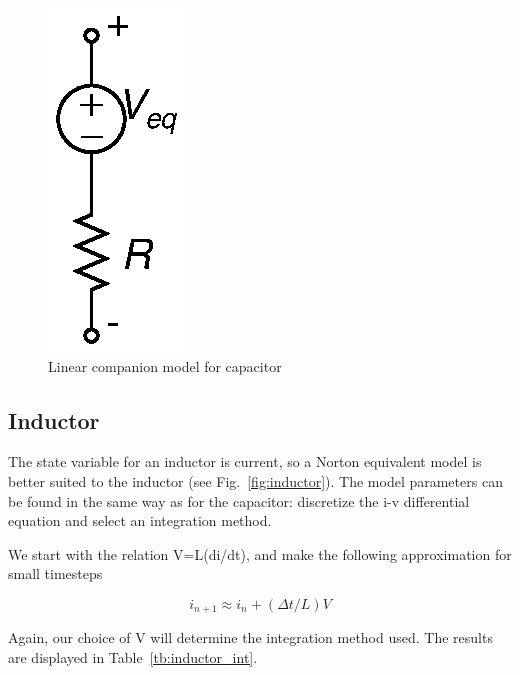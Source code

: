 \documentclass{article}
\begin{document}
\begin{figure}[h]
\begin{center}
\includegraphics{fig/cap.eps}
\caption{Linear companion model for capacitor \label{fig:cap}}
\end{center}
\end{figure}

\pagebreak

\subsection{Inductor}

The state variable for an inductor is current, so a Norton equivalent model is better suited to the inductor (see Fig.~\ref{fig:inductor}).  The model parameters can be found in the same way as for the capacitor: discretize the i-v differential equation and select an integration method.

We start with the relation V=L(di/dt), and make the following approximation for small timesteps

\begin{equation}
i_{n+1} \approx i_n + (\Delta t/L)V
\end{equation}

Again, our choice of V will determine the integration method used.  The results are displayed in Table~\ref{tb:inductor_int}.
\end{document}
